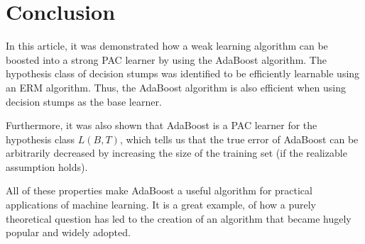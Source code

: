\section{Conclusion}
\label{conclusion}

In this article, it was demonstrated how a weak learning algorithm can be boosted into a strong PAC learner by using the
AdaBoost algorithm.
The hypothesis class of decision stumps was identified to be efficiently learnable using an ERM algorithm.
Thus, the AdaBoost algorithm is also efficient when using decision stumps as the base learner.

Furthermore, it was also shown that AdaBoost is a PAC learner for the hypothesis class $L(B, T)$, which tells us
that the true error of AdaBoost can be arbitrarily decreased by increasing the size of the training set
(if the realizable assumption holds).

All of these properties make AdaBoost a useful algorithm for practical applications of machine learning.
It is a great example, of how a purely theoretical question has led to the creation of an algorithm that became 
hugely popular and widely adopted.
